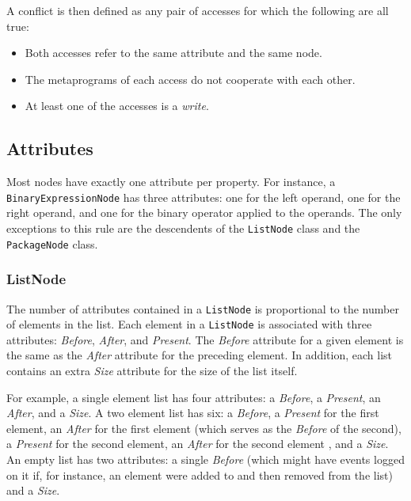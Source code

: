 \documentclass[a4paper,10pt]{report}
\begin{document}
A conflict is then defined as any pair of accesses for which the following are all true:
\begin{itemize}
    \item Both accesses refer to the same attribute and the same node.
    \item The metaprograms of each access do not cooperate with each other.
    \item At least one of the accesses is a \textit{write}.
\end{itemize}

\subsection{Attributes}
\label{secMetaprogDepsAtts}

Most nodes have exactly one attribute per property.  For instance, a \verb`BinaryExpressionNode` has three attributes: one for the left operand, one for the right operand, and one for the binary operator applied to the operands.  The only exceptions to this rule are the descendents of the \verb`ListNode` class and the \verb`PackageNode` class.

\subsubsection{ListNode}
\label{secMetaprogDepsAttsList}

The number of attributes contained in a \verb`ListNode` is proportional to the number of elements in the list.  Each element in a \verb`ListNode` is associated with three attributes: \textit{Before}, \textit{After}, and \textit{Present}.  The \textit{Before} attribute for a given element is the same as the \textit{After} attribute for the preceding element.  In addition, each list contains an extra \textit{Size} attribute for the size of the list itself.

For example, a single element list has four attributes: a \textit{Before}, a \textit{Present}, an \textit{After}, and a \textit{Size}.  A two element list has six: a \textit{Before}, a \textit{Present} for the first element, an \textit{After} for the first element (which serves as the \textit{Before} of the second), a \textit{Present} for the second element, an \textit{After} for the second element , and a \textit{Size}.  An empty list has two attributes: a single \textit{Before} (which might have events logged on it if, for instance, an element were added to and then removed from the list) and a \textit{Size}.
\end{document}
